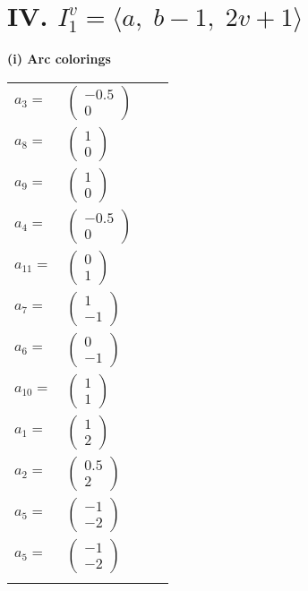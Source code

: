 \documentclass[1p]{elsarticle_modified}
\theoremstyle{definition}
\begin{document}
\centering \section*{IV. $I^v_{1}= \langle a,\;b-1,\;2 v+1 \rangle$}
\flushleft \textbf{(i) Arc colorings}\\
\begin{tabular}{m{7pt} m{180pt} m{7pt} m{180pt} }
\flushright $a_{3}=$&$\begin{pmatrix}-0.5\\0\end{pmatrix}$ \\
\flushright $a_{8}=$&$\begin{pmatrix}1\\0\end{pmatrix}$ \\
\flushright $a_{9}=$&$\begin{pmatrix}1\\0\end{pmatrix}$ \\
\flushright $a_{4}=$&$\begin{pmatrix}-0.5\\0\end{pmatrix}$ \\
\flushright $a_{11}=$&$\begin{pmatrix}0\\1\end{pmatrix}$ \\
\flushright $a_{7}=$&$\begin{pmatrix}1\\-1\end{pmatrix}$ \\
\flushright $a_{6}=$&$\begin{pmatrix}0\\-1\end{pmatrix}$ \\
\flushright $a_{10}=$&$\begin{pmatrix}1\\1\end{pmatrix}$ \\
\flushright $a_{1}=$&$\begin{pmatrix}1\\2\end{pmatrix}$ \\
\flushright $a_{2}=$&$\begin{pmatrix}0.5\\2\end{pmatrix}$ \\
\flushright $a_{5}=$&$\begin{pmatrix}-1\\-2\end{pmatrix}$\\ \flushright $a_{5}=$&$\begin{pmatrix}-1\\-2\end{pmatrix}$\\&\end{tabular}
\end{document}
